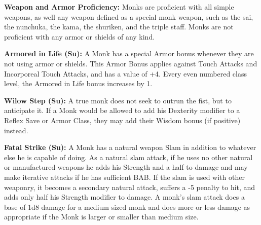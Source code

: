 \begin{monkclasstable}
\end{monkclasstable}

\classfeatures

\textbf{Weapon and Armor Proficiency:} Monks are proficient with all simple weapons, as well any weapon defined as a special monk weapon, such as the sai, the nunchuka, the kama, the shuriken, and the triple staff. Monks are not proficient with any armor or shields of any kind.

\textbf{Armored in Life (Su):} A Monk has a special Armor bonus whenever they are not using armor or shields. This Armor Bonus applies against Touch Attacks and Incorporeal Touch Attacks, and has a value of +4. Every even numbered class level, the Armored in Life bonus increases by 1.

\textbf{Wilow Step (Su):} A true monk does not seek to outrun the fist, but to anticipate it. If a Monk would be allowed to add his Dexterity modifier to a Reflex Save or Armor Class, they may add their Wisdom bonus (if positive) instead.

\textbf{Fatal Strike (Su):} A Monk has a natural weapon Slam in addition to whatever else he is capable of doing. As a natural slam attack, if he uses no other natural or manufactured weapons he adds his Strength and a half to damage and may make iterative attacks if he has sufficient BAB. If the slam is used with other weaponry, it becomes a secondary natural attack, suffers a -5 penalty to hit, and adds only half his Strength modifier to damage. A monk's slam attack does a base of 1d8 damage for a medium sized monk and does more or less damage as appropriate if the Monk is larger or smaller than medium size.

